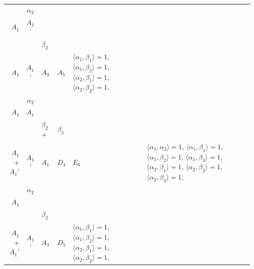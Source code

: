 \documentclass[12pt]{report}
\begin{document}
\begin{appendix}
{\begin{longtable}{rcl p{1cm}p{1cm}p{3cm} }
\begin{tabular}{cc}$\alpha_1$+ & $\alpha_2$\\\tiny{ $A_1$ } & \tiny{ $A_1$' }\end{tabular} &\begin{tabular}{c} = \\~ \end{tabular} & \begin{tabular}{cc}$\beta_1$+ & $\beta_2$\\\tiny{ $A_1$ } & \tiny{ $A_1$' }\end{tabular} & $A_3$ & $A_5$ &  $\langle\alpha_1, \beta_1\rangle=1$, $\langle\alpha_1, \beta_2\rangle=1$, $\langle\alpha_2, \beta_1\rangle=1$, $\langle\alpha_2, \beta_2\rangle=1$, 
\\
\begin{tabular}{cc}$\alpha_1$+ & $\alpha_2$\\\tiny{ $A_1$ } & \tiny{ $A_1$ }\end{tabular} &\begin{tabular}{c} = \\~ \end{tabular} & \begin{tabular}{ccc}$\beta_1$+ & $\beta_2$+ & $\beta_3$\\\tiny{ $A_1$+$A_1$' } & \tiny{ $A_1$' } & \tiny{ $A_1$ }\end{tabular} & $D_4$ & $E_6$ & $\langle\alpha_1, \alpha_2\rangle=1$,  $\langle\alpha_1, \beta_1\rangle=1$, $\langle\alpha_1, \beta_2\rangle=1$, $\langle\alpha_1, \beta_3\rangle=1$, $\langle\alpha_2, \beta_1\rangle=1$, $\langle\alpha_2, \beta_2\rangle=1$, $\langle\alpha_2, \beta_3\rangle=1$, 
\\
\begin{tabular}{cc}$\alpha_1$+ & $\alpha_2$\\\tiny{ $A_1$ } & \tiny{  }\end{tabular} &\begin{tabular}{c} = \\~ \end{tabular} & \begin{tabular}{cc}$\beta_1$+ & $\beta_2$\\\tiny{ $A_1$+$A_1$' } & \tiny{ $A_1$' }\end{tabular} & $A_3$ & $D_5$ &  $\langle\alpha_1, \beta_1\rangle=1$, $\langle\alpha_1, \beta_2\rangle=1$, $\langle\alpha_2, \beta_1\rangle=1$, $\langle\alpha_2, \beta_2\rangle=1$, 
\\

\end{longtable}}
\end{appendix}
\end{document}

